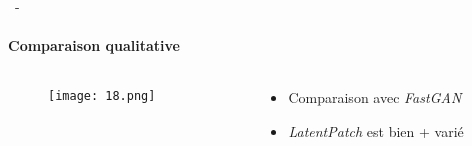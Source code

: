 \documentclass[aspectratio=169, 22pt]{beamer}
\begin{document}
\begin{frame}{\secname~- \subsecname}
  \framesubtitle{Comparaison qualitative}
  \begin{columns}
    \begin{column}{0.75\linewidth}
      \begin{figure}
        \texttt{[image: 18.png]}
      \end{figure}
    \end{column}
    \begin{column}{0.25\linewidth}
      \begin{itemize}
      \item Comparaison avec \emph{FastGAN}
      \item \emph{LatentPatch} est bien + varié
      \end{itemize}
    \end{column}
  \end{columns}  
\end{frame}


 
\end{document}
